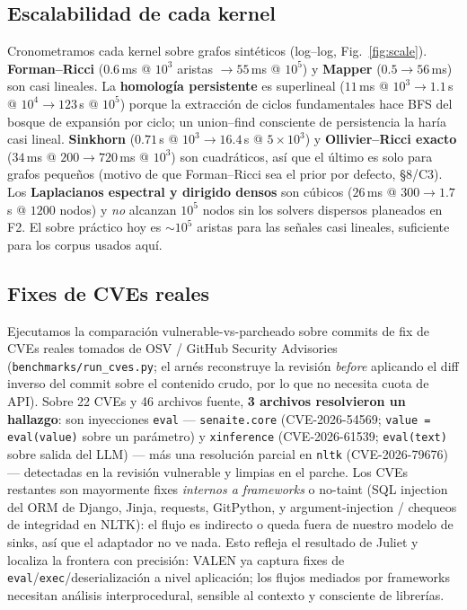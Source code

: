 \documentclass[11pt]{article}
\begin{document}
\subsection{Escalabilidad de cada kernel}
Cronometramos cada kernel sobre grafos sintéticos (log--log,
Fig.~\ref{fig:scale}). \textbf{Forman--Ricci} ($0.6$\,ms @ $10^3$ aristas
$\to 55$\,ms @ $10^5$) y \textbf{Mapper} ($0.5\to56$\,ms) son casi lineales. La
\textbf{homología persistente} es superlineal ($11$\,ms @ $10^3 \to 1.1$\,s @
$10^4 \to 123$\,s @ $10^5$) porque la extracción de ciclos fundamentales hace
BFS del bosque de expansión por ciclo; un union--find consciente de persistencia
la haría casi lineal. \textbf{Sinkhorn} ($0.71$\,s @ $10^3 \to 16.4$\,s @
$5\times10^3$) y \textbf{Ollivier--Ricci exacto} ($34$\,ms @ $200 \to 720$\,ms @
$10^3$) son cuadráticos, así que el último es solo para grafos pequeños (motivo
de que Forman--Ricci sea el prior por defecto, \S8/C3). Los \textbf{Laplacianos
espectral y dirigido densos} son cúbicos ($26$\,ms @ $300 \to 1.7$\,s @ $1200$
nodos) y \emph{no} alcanzan $10^5$ nodos sin los solvers dispersos planeados en
F2. El sobre práctico hoy es $\sim10^5$ aristas para las señales casi lineales,
suficiente para los corpus usados aquí.



\subsection{Fixes de CVEs reales}
Ejecutamos la comparación vulnerable-vs-parcheado sobre commits de fix de CVEs
reales tomados de OSV / GitHub Security Advisories
(\texttt{benchmarks/run\_cves.py}; el arnés reconstruye la revisión \emph{before}
aplicando el diff inverso del commit sobre el contenido crudo, por lo que no
necesita cuota de API). Sobre 22 CVEs y 46 archivos fuente, \textbf{3 archivos
resolvieron un hallazgo}: son inyecciones \texttt{eval} ---
\texttt{senaite.core} (CVE-2026-54569; \texttt{value = eval(value)} sobre un
parámetro) y \texttt{xinference} (CVE-2026-61539; \texttt{eval(text)} sobre salida
del LLM) --- más una resolución parcial en \texttt{nltk} (CVE-2026-79676) ---
detectadas en la revisión vulnerable y limpias en el parche. Los CVEs restantes
son mayormente fixes \emph{internos a frameworks} o no-taint (SQL injection del
ORM de Django, Jinja, requests, GitPython, y argument-injection / chequeos de
integridad en NLTK): el flujo es indirecto o queda fuera de nuestro modelo de
sinks, así que el adaptador no ve nada. Esto refleja el resultado de Juliet y
localiza la frontera con precisión: VALEN ya captura fixes de
\texttt{eval}/\texttt{exec}/deserialización a nivel aplicación; los flujos
mediados por frameworks necesitan análisis interprocedural, sensible al contexto
y consciente de librerías.
\end{document}
